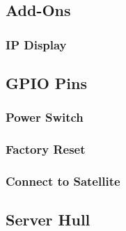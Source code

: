 
\subsection{Add-Ons}


\subsubsection{IP Display}

\subsection{GPIO Pins}

\subsubsection{Power Switch}

\subsubsection{Factory Reset}

\subsubsection{Connect to Satellite}

\subsection{Server Hull}


